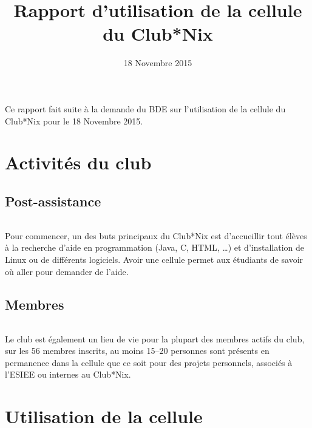 \documentclass[11pt]{report}
\title{Rapport d'utilisation de la cellule du Club*Nix}
\date{18 Novembre 2015}
\begin{document}
\maketitle

\paragraph{} Ce rapport fait suite à la demande du BDE sur l'utilisation de la
cellule du Club*Nix pour le 18 Novembre 2015.

\tableofcontents

\part{Activités du club}

\chapter{Post-assistance}

\paragraph{} Pour commencer, un des buts principaux du Club*Nix est
d'accueillir tout élèves à la recherche d'aide en programmation (Java, C, HTML,
\ldots) et d'installation de Linux ou de différents logiciels. Avoir une cellule
permet aux étudiants de savoir où aller pour demander de l'aide.


\chapter{Membres}

\paragraph{} Le club est également un lieu de vie pour la plupart des membres
actifs du club, sur les 56 membres inscrits, au moins 15--20 personnes sont
présents en permanence dans la cellule que ce soit pour des projets personnels,
associés à l'ESIEE ou internes au Club*Nix.

\part{Utilisation de la cellule}
\end{document}
